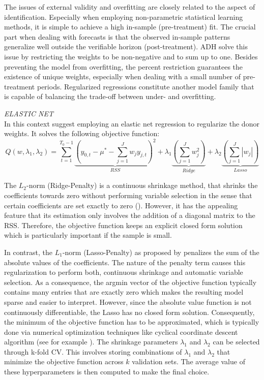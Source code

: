 The issues of external validity and overfitting are closely related to the aspect of identification. Especially when employing non-parametric statistical learning methods, it is simple to achieve a high in-sample (pre-treatment) fit. The crucial part when dealing with forecasts is that the observed in-sample patterns generalize well outside the verifiable horizon (post-treatment). \ac{ADH} solve this issue by restricting the weights to be non-negative and to sum up to one. Besides preventing the model from overfitting, the percent restriction guarantees the existence of unique weights, especially when dealing with a small number of pre-treatment periods. Regularized regressions constitute another model family that is capable of balancing the trade-off between under- and overfitting. 

\textit{ELASTIC NET} \\
In this context \cite{doudchenko:2016} suggest employing an elastic net regression to regularize the donor weights. It solves the following objective function:
\[
Q(w, \lambda_1, \lambda_2) = 
\sum_{t=1}^{T_0-1}\underbrace{\left(y_{0,t} - \mu^* - \sum_{j = 1}^{J} w_j y_{j,t} \right)^2}_{RSS} + \lambda_1 \underbrace{\left( \sum_{j = 1}^{J} w_j^2 \right)}_{Ridge} + 
\lambda_2 \underbrace{\left( \sum_{j = 1}^{J} |w_j| \right)  }_{Lasso}
\]

The $L_2$-norm (Ridge-Penalty) is a continuous shrinkage method, that shrinks the coefficients towards zero without performing variable selection in the sense that certain coefficients are set exactly to zero (\cite{hoerl:1970}). However, it has the appealing feature that its estimation only involves the addition of a diagonal matrix to the \ac{RSS}. Therefore, the objective function keeps an explicit closed form solution which is particularly important if the sample is small.

In contrast, the $L_1$-norm (Lasso-Penalty) as proposed by \cite{tibshirani:1996} penalizes the sum of the absolute values of the coefficients. The nature of the penalty term causes this regularization to perform both, continuous shrinkage and automatic variable selection. As a consequence, the argmin vector of the objective function typically contains many entries that are exactly zero which makes the resulting model sparse and easier to interpret. However, since the absolute value function is not continuously differentiable, the Lasso has no closed form solution. Consequently, the minimum of the objective function has to be approximated, which is typically done via numerical optimization techniques like cyclical coordinate descent algorithm (see for example \cite{friedman:2010}). The shrinkage parameters $\lambda_1$ and $\lambda_2$ can be selected through k-fold \ac{CV}. This involves storing combinations of $\lambda_1$ and $\lambda_2$ that minimize the objective function across $k$ validation sets. The average value of these hyperparameters is then computed to make the final choice.

